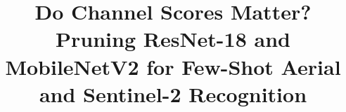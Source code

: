 \title{Do Channel Scores Matter? Pruning ResNet-18 and MobileNetV2 for Few-Shot Aerial and Sentinel-2 Recognition}
